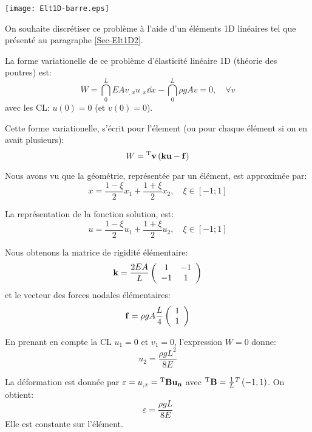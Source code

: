 \centerline{\texttt{[image: Elt1D-barre.eps]}}

On souhaite discrétiser ce problème à l'aide d'un éléments 1D linéaires
tel que présenté au paragraphe \ref{Sec-Elt1D2}.

\medskip
La forme variationelle de ce problème d'élasticité linéaire 1D (théorie des poutres) est:
\begin{equation}
W=\dint_0^L EA v_{,x}u_{,x} \dd x - \dint_0^L \rho g A v = 0, \quad \forall v
\end{equation}
avec les CL: $u(0)=0$ (et $v(0)=0$).


Cette forme variationelle, s'écrit pour l'élement (ou pour chaque élément si on en avait plusieurs):
\begin{equation}
W = {}^\mathrm{T}\mathbf{v} \left( \mathbf{k}\mathbf{u} - \mathbf{f} \right)
\end{equation}

\medskip
Nous avons vu que la géométrie, représentée par un élément, est approximée par:
\begin{equation} x=\frac{1-\xi}2 x_1 + \frac{1+\xi}2 x_2, \quad \xi\in[-1;1] \end{equation}

La représentation de la fonction solution, est:
\begin{equation} u = \frac{1-\xi}2 u_1 + \frac{1+\xi}2 u_2, \quad \xi\in[-1;1] \end{equation}

\medskip
Nous obtenons la matrice de rigidité élémentaire:
\begin{equation} \mathbf{k} = \frac{2EA}L \left(  \begin{array}{cc} 1 & -1\\ -1& 1 \end{array}\right) \end{equation}
et le vecteur des forces nodales élémentaires:
\begin{equation}  \mathbf{f} = \rho g A \frac{L}4 \left(  \begin{array}{c} 1 \\1 \end{array}\right) \end{equation}

\medskip
En prenant en compte la CL $u_1=0$ et $v_1=0$, l'expression $W=0$ donne:
\begin{equation} u_2 = \frac{\rho g L^2}{8 E} \end{equation}

\medskip
La déformation est donnée par $\varepsilon=u_{,x}={}^\mathrm{T}\mathbf{B}\mathbf{u_n}$ avec ${}^\mathrm{T}\mathbf{B}=\frac1L {}^T\left( -1, 1\right)$.
On obtient: \begin{equation}\varepsilon=\frac{\rho g L}{8 E}\end{equation} Elle est constante sur l'élément.

